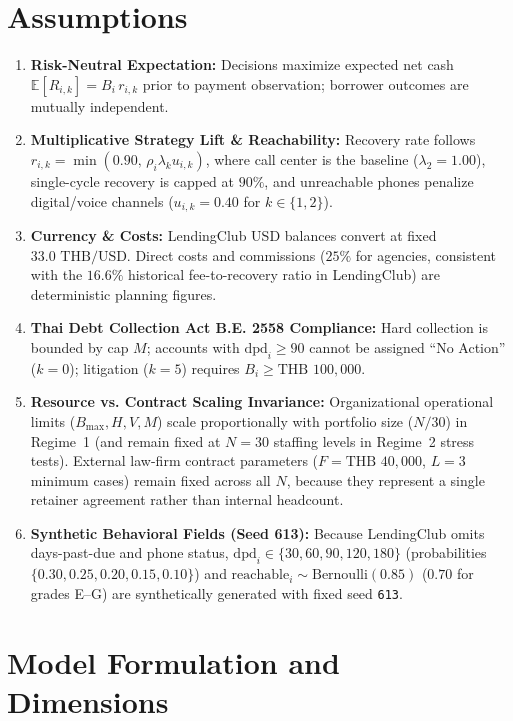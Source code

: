 \documentclass[10pt,a4paper]{article}
\begin{document}
\section{Assumptions}
\begin{enumerate}
    \item \textbf{Risk-Neutral Expectation:} Decisions maximize expected net cash $\mathbb{E}[R_{i,k}] = B_i\, r_{i,k}$ prior to payment observation; borrower outcomes are mutually independent.
    \item \textbf{Multiplicative Strategy Lift \& Reachability:} Recovery rate follows $r_{i,k} = \min(0.90,\, \rho_i \lambda_k u_{i,k})$, where call center is the baseline ($\lambda_2=1.00$), single-cycle recovery is capped at $90\%$, and unreachable phones penalize digital/voice channels ($u_{i,k}=0.40$ for $k\in\{1,2\}$).
    \item \textbf{Currency \& Costs:} LendingClub USD balances convert at fixed $33.0\text{ THB/USD}$. Direct costs and commissions ($25\%$ for agencies, consistent with the $16.6\%$ historical fee-to-recovery ratio in LendingClub) are deterministic planning figures.
    \item \textbf{Thai Debt Collection Act B.E. 2558 Compliance:} Hard collection is bounded by cap $M$; accounts with $\text{dpd}_i \ge 90$ cannot be assigned ``No Action'' ($k=0$); litigation ($k=5$) requires $B_i \ge \text{THB~}100{,}000$.
    \item \textbf{Resource vs. Contract Scaling Invariance:} Organizational operational limits ($B_{\max}, H, V, M$) scale proportionally with portfolio size ($N/30$) in Regime~1 (and remain fixed at $N=30$ staffing levels in Regime~2 stress tests). External law-firm contract parameters ($F = \text{THB~}40{,}000$, $L = 3$ minimum cases) remain fixed across all $N$, because they represent a single retainer agreement rather than internal headcount.
    \item \textbf{Synthetic Behavioral Fields (Seed 613):} Because LendingClub omits days-past-due and phone status, $\text{dpd}_i \in \{30,60,90,120,180\}$ (probabilities $\{0.30,0.25,0.20,0.15,0.10\}$) and $\text{reachable}_i \sim \text{Bernoulli}(0.85)$ ($0.70$ for grades E--G) are synthetically generated with fixed seed \texttt{613}.
\end{enumerate}

\section{Model Formulation and Dimensions}
\end{document}
